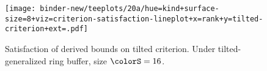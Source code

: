 \begin{figure}
\vspace{0pt}
  \centering
  \texttt{[image: binder-new/teeplots/20a/hue=kind+surface-size=8+viz=criterion-satisfaction-lineplot+x=rank+y=tilted-criterion+ext=.pdf]}

\vspace{-3ex}
\caption{%
  Satisfaction of derived bounds on tilted criterion.
  \footnotesize
  Under tilted-generalized ring buffer, size $\colorS=16$.
}
\label{fig:hsurf-tilted-implementation-satisfaction}
\end{figure}
